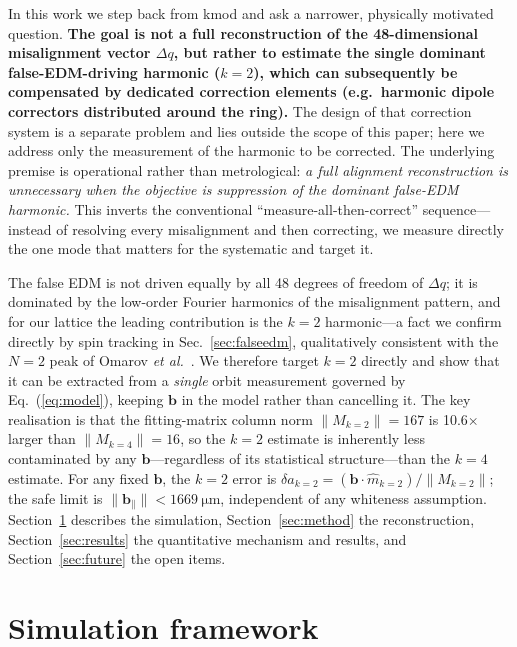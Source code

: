 \documentclass[preprint,12pt]{elsarticle}
\begin{document}
In this work we step back from kmod and ask a narrower, physically
motivated question. \textbf{The goal is not a full reconstruction of the
48-dimensional misalignment vector $\Delta q$, but rather to estimate the
single dominant false-EDM-driving harmonic ($k=2$), which can subsequently
be compensated by dedicated correction elements (e.g.\ harmonic dipole
correctors distributed around the ring).} The design of that correction
system is a separate problem and lies outside the scope of this paper; here
we address only the measurement of the harmonic to be corrected. The
underlying premise is operational rather than metrological: \emph{a full
alignment reconstruction is unnecessary when the objective is suppression of
the dominant false-EDM harmonic.} This inverts the conventional
``measure-all-then-correct'' sequence---instead of resolving every
misalignment and then correcting, we measure directly the one mode that
matters for the systematic and target it.

The false EDM is not driven
equally by all 48 degrees of freedom of $\Delta q$; it is dominated by the
low-order Fourier harmonics of the misalignment pattern, and for our lattice
the leading contribution is the $k=2$ harmonic---a fact we confirm directly
by spin tracking in Sec.~\ref{sec:falseedm}, qualitatively consistent with
the $N=2$ peak of Omarov \emph{et al.}~\cite{omarov}. We therefore target
$k=2$ directly and show that it can be extracted from a \emph{single} orbit
measurement governed by Eq.~(\ref{eq:model}), keeping $\mathbf{b}$ in the
model rather than cancelling it. The key realisation is that the fitting-matrix column norm $\|M_{k=2}\|=167$
is 10.6$\times$ larger than $\|M_{k=4}\|=16$, so the $k=2$ estimate is
inherently less contaminated by any $\mathbf{b}$---regardless of its
statistical structure---than the $k=4$ estimate.
For any fixed $\mathbf{b}$, the $k=2$ error is
$\delta a_{k=2}=(\mathbf{b}\cdot\hat{m}_{k=2})/\|M_{k=2}\|$;
the safe limit is $\|\mathbf{b}_{\parallel}\|<\SI{1669}{\micro\meter}$,
independent of any whiteness assumption.
Section~\ref{sec:sim} describes the simulation,
Section~\ref{sec:method} the reconstruction, Section~\ref{sec:results}
the quantitative mechanism and results, and Section~\ref{sec:future} the
open items.

\section{Simulation framework}
\label{sec:sim}
\end{document}
